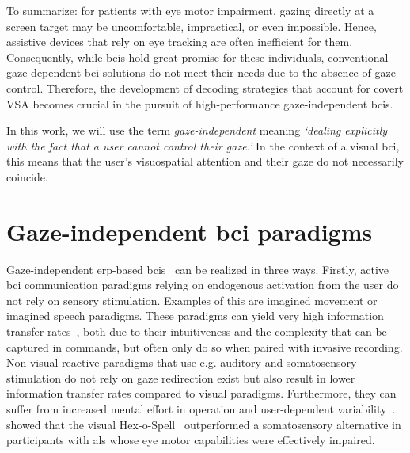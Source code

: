 To summarize: for patients with eye motor impairment, gazing directly at a screen target may
be uncomfortable, impractical, or even impossible.
Hence, assistive devices that rely on eye tracking are often inefficient for
them.
Consequently, while \ac{bci}s hold great promise for these individuals, conventional
gaze-dependent \ac{bci} solutions do not meet their needs due to the absence of gaze
control.
Therefore, the development of decoding strategies that account for covert
VSA becomes crucial in the pursuit of high-performance gaze-independent
\ac{bci}s.

In this work, we will use the term \emph{gaze-independent} meaning
\emph{‘dealing explicitly with the fact that a user cannot control their
gaze.'}
In the context of a visual \ac{bci}, this means that the user's
visuospatial attention and their gaze do not necessarily coincide.



\section{Gaze-independent \ac{bci} paradigms}
\label{sec:gaze-independence}

Gaze-independent \ac{erp}-based \ac{bci}s~\cite{Riccio2012, Aloise2012} can be realized in three
ways.
Firstly, active \ac{bci} communication paradigms relying on endogenous activation from the user
do not rely on sensory stimulation.
Examples of this are imagined movement or imagined speech paradigms.
These paradigms can yield very high information transfer
rates~\cite{Willett2021,Metzger2023}, both due to their intuitiveness and the
complexity that can be captured in commands, but often only do so when paired
with invasive recording.
Non-visual reactive paradigms that use e.g. auditory and
somatosensory
stimulation do not rely on gaze redirection exist but also result in lower information transfer
rates compared to visual paradigms.
Furthermore, they can suffer from increased mental effort in operation and
user-dependent variability~\cite{Severens2014,Reichert2020b}.
\textcite{Severens2014} showed that the visual Hex-o-Spell~\cite{Treder2010}
outperformed a somatosensory alternative in participants with \ac{als} whose
eye motor capabilities were effectively impaired.


